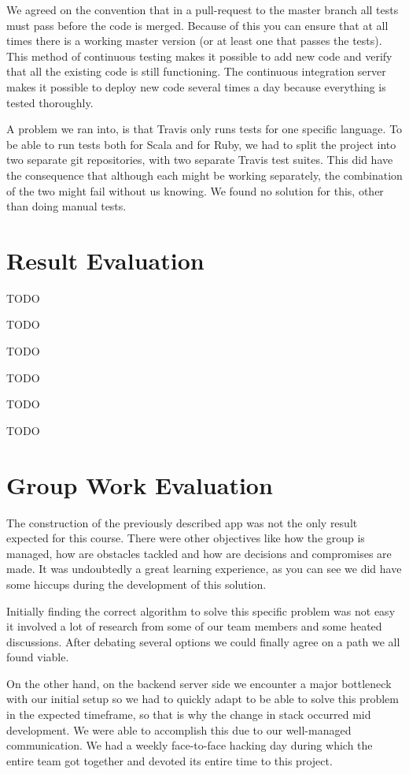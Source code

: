 We agreed on the convention that in a pull-request to the master branch all tests must pass before the code is merged. Because of this you can ensure that at all times there is a working master version (or at least one that passes the tests). This method of continuous testing makes it possible to add new code and verify that all the existing code is still functioning. The continuous integration server makes it possible to deploy new code several times a day because everything is tested thoroughly.

A problem we ran into, is that Travis only runs tests for one specific language. To be able to run tests both for Scala and for Ruby, we had to split the project into two separate git repositories, with two separate Travis test suites. This did have the consequence that although each might be working separately, the combination of the two might fail without us knowing. We found no solution for this, other than doing manual tests.

\section{Result Evaluation}
TODO

TODO

TODO

TODO

TODO

TODO

\section{Group Work Evaluation}
The construction of the previously described app was not the only result expected for this course. There were other objectives like how the group is managed, how are obstacles tackled and how are decisions and compromises are made. It was undoubtedly a great learning experience, as you can see we did have some hiccups during the development of this solution. 

Initially finding the correct algorithm to solve this specific problem was not easy it involved a lot of research from some of our team members and some heated discussions. After debating several options we could finally agree on a path we all found viable.

On the other hand, on the backend server side we encounter a major bottleneck with our initial setup so we had to quickly adapt to be able to solve this problem in the expected timeframe, so that is why the change in stack occurred mid development. We were able to accomplish this due to our well-managed communication. We had a weekly face-to-face hacking day during which the entire team got together and devoted its entire time to this project.

